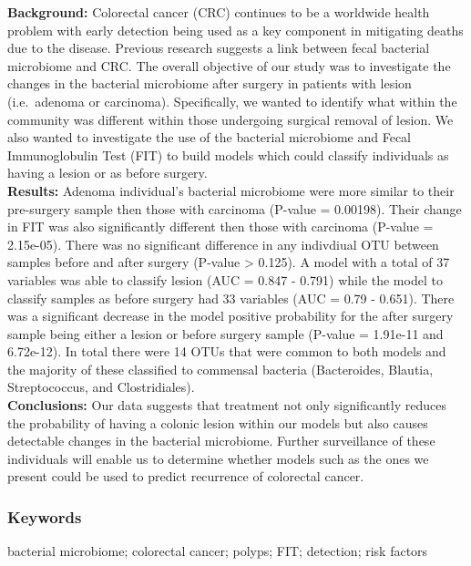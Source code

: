 \documentclass[12pt,]{article}
\begin{document}
\textbf{Background:} Colorectal cancer (CRC) continues to be a worldwide
health problem with early detection being used as a key component in
mitigating deaths due to the disease. Previous research suggests a link
between fecal bacterial microbiome and CRC. The overall objective of our
study was to investigate the changes in the bacterial microbiome after
surgery in patients with lesion (i.e.~adenoma or carcinoma).
Specifically, we wanted to identify what within the community was
different within those undergoing surgical removal of lesion. We also
wanted to investigate the use of the bacterial microbiome and Fecal
Immunoglobulin Test (FIT) to build models which could classify
individuals as having a lesion or as before surgery.\\
\textbf{Results:} Adenoma individual's bacterial microbiome were more
similar to their pre-surgery sample then those with carcinoma (P-value =
0.00198). Their change in FIT was also significantly different then
those with carcinoma (P-value = 2.15e-05). There was no significant
difference in any indivdiual OTU between samples before and after
surgery (P-value \textgreater{} 0.125). A model with a total of 37
variables was able to classify lesion (AUC = 0.847 - 0.791) while the
model to classify samples as before surgery had 33 variables (AUC = 0.79
- 0.651). There was a significant decrease in the model positive
probability for the after surgery sample being either a lesion or before
surgery sample (P-value = 1.91e-11 and 6.72e-12). In total there were 14
OTUs that were common to both models and the majority of these
classified to commensal bacteria (Bacteroides, Blautia, Streptococcus,
and Clostridiales).\\
\textbf{Conclusions:} Our data suggests that treatment not only
significantly reduces the probability of having a colonic lesion within
our models but also causes detectable changes in the bacterial
microbiome. Further surveillance of these individuals will enable us to
determine whether models such as the ones we present could be used to
predict recurrence of colorectal cancer.

\newpage

\subsubsection{Keywords}\label{keywords}

bacterial microbiome; colorectal cancer; polyps; FIT; detection; risk
factors

\newpage
\end{document}
